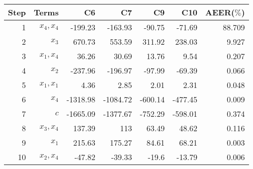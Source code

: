 \begin{tabular}{rrrrrrr}
Step & Terms & C6 & C7 & C9 & C10 & AEER($\%$) \\ 
\hline 
1 & $x_4,x_4$ & -199.23 & -163.93 & -90.75 & -71.69 & 88.709 \\ 
2 & $x_3$ & 670.73 & 553.59 & 311.92 & 238.03 & 9.927 \\ 
3 & $x_1,x_4$ & 36.26 & 30.69 & 13.76 & 9.54 & 0.207 \\ 
4 & $x_2$ & -237.96 & -196.97 & -97.99 & -69.39 & 0.066 \\ 
5 & $x_1,x_1$ & 4.36 & 2.85 & 2.01 & 2.31 & 0.048 \\ 
6 & $x_4$ & -1318.98 & -1084.72 & -600.14 & -477.45 & 0.009 \\ 
7 & $c$ & -1665.09 & -1377.67 & -752.29 & -598.01 & 0.374 \\ 
8 & $x_3,x_4$ & 137.39 & 113 & 63.49 & 48.62 & 0.116 \\ 
9 & $x_1$ & 215.63 & 175.27 & 84.61 & 68.21 & 0.003 \\ 
10 & $x_2,x_4$ & -47.82 & -39.33 & -19.6 & -13.79 & 0.006 \\ 
\hline 
\end{tabular}